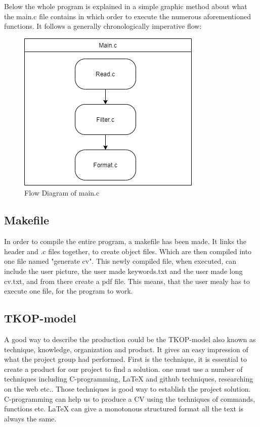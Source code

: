 Below the whole program is explained in a simple graphic method about what the main.c file contains 
in which order to execute the numerous aforementioned functions.
It follows a generally chronologically imperative flow:
\begin{figure}[H]
  \centering
  \includegraphics[scale = 0.6]{figures/main.png}
  \caption{Flow Diagram of main.c}
\end{figure}
\subsection{Makefile}
In order to compile the entire program, a makefile has been made. It links the header and .c files together, to create object files. Which are then compiled into one file named "generate cv".
This newly compiled file, when executed, can include the user picture, the user made keywords.txt and the user made long cv.txt, and from there create a pdf file.
This means, that the user mealy has to execute one file, for the program to work.

\subsection{TKOP-model}
A good way to describe the production could be the TKOP-model also known as technique, knowledge, organization and product.
It gives an easy impression of what the project group had performed.
First is the technique, it is essential to create a product for our project to find a solution. 
one must use a number of techniques including C-programming, LaTeX and github techniques, researching on the web etc..
Those techniques is good way to establish the project solution. C-programming can help us to produce a CV using the techniques
of commands, functions etc. LaTeX can give a monotonous structured format all the text is always the same. \\


